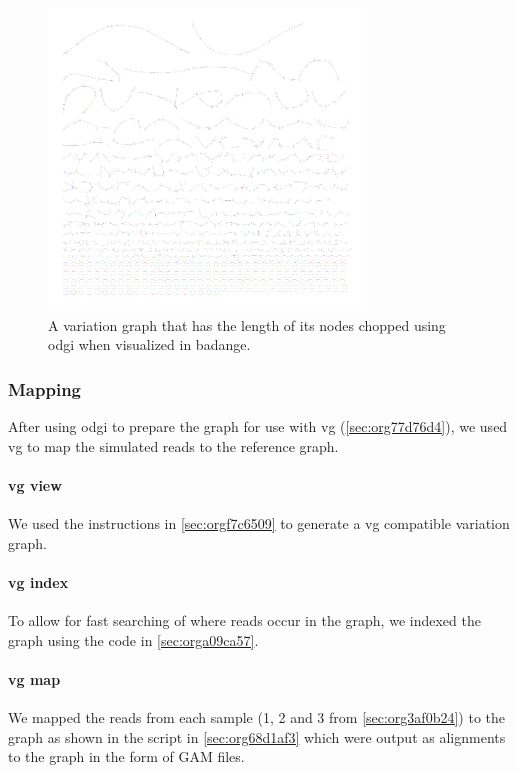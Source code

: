 \documentclass[10pt, a4paper]{article}
\begin{document}
\begin{figure}[h]
\centering
\includegraphics[width=0.75\textwidth]{../Figures/SARS_CoV_2/SARS_Variation_Graph.png}
\caption[SARS-CoV-2 Variation Graph]{\label{fig:orgc390351}
A variation graph that has the length of its nodes chopped using odgi when visualized in badange.}
\end{figure}

\subsubsection{Mapping}
\label{sec:orgd9aeaef}
After using odgi to prepare the graph for use with vg
(\ref{sec:org77d76d4}), we used vg to map the simulated reads to
the reference graph.

\paragraph{vg view}
\label{sec:org56c057a}
We used the instructions in \ref{sec:orgf7c6509} to generate a vg
\cite{garrisonVariationGraphToolkit2018} compatible variation graph. 

\paragraph{vg index}
\label{sec:org8378d72}
To allow for fast searching of where reads occur in the graph, we indexed the 
graph using the code in \ref{sec:orga09ca57}.

\paragraph{vg map}
\label{sec:org892f4c7}
We mapped the reads from each sample (1, 2 and 3 from \ref{sec:org3af0b24})  to the 
graph as shown in the script in \ref{sec:org68d1af3} which were output as  alignments to 
the graph in the form of GAM files. 
\end{document}
